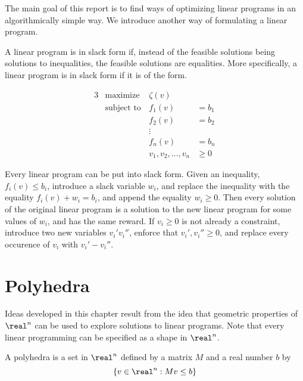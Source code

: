     The main goal of this report is to find ways of optimizing linear programs in an algorithmically simple way. We introduce another way of formulating a linear program.

    \begin{definition}
        A linear program is in slack form if, instead of the feasible solutions being solutions to inequalities, the feasible solutions are equalities. More specifically, a linear program is in slack form if it is of the form.

        \begin{alignat*}{3}
        &\text{maximize }  & \zeta(v) &\\
        &\text{subject to} & f_1(v) &= b_1\\
        &                  & f_2(v) &= b_2\\
        &                  & \vdots &\\
        &                  & f_n(v) &= b_n\\
        &                  & v_1,v_2,\dots,v_n &\geq 0
        \end{alignat*}
    \end{definition}

    Every linear program can be put into slack form. Given an inequality, $f_i(v) \leq b_i$, introduce a slack variable $w_i$, and replace the inequality with the equality $f_i(v) + w_i = b_i$, and append the equality $w_i \geq 0$. Then every solution of the original linear program is a solution to the new linear program for some values of $w_i$, and has the same reward. If $v_i \geq 0$ is not already a constraint, introduce two new variables $v_i' v_i''$, enforce that $v_i',v_i'' \geq 0$, and replace every occurence of $v_i$ with $v_i' - v_i''$.









    \chapter{Polyhedra}

    Ideas developed in this chapter result from the idea that geometric properties of $\real^n$ can be used to explore solutions to linear programs. Note that every linear programming can be specified as a shape in $\real^n$.

    \begin{definition}
        A polyhedra is a set in $\real^n$ defined by a matrix $M$ and a real number $b$ by
        \[ \{ v \in \real^n : Mv \leq b \} \]
    \end{definition}

